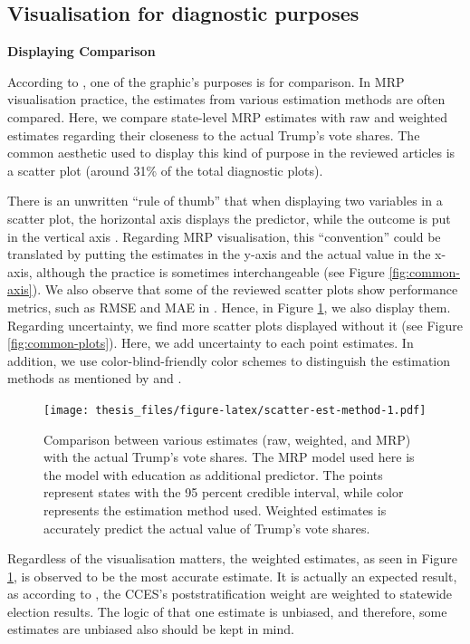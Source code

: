 \documentclass{monashthesis}
\begin{document}
\hypertarget{vis-purp}{%
\subsection{Visualisation for diagnostic purposes}\label{vis-purp}}

\textbf{Displaying Comparison}

According to \textcite{tukey}, one of the graphic's purposes is for comparison. In MRP visualisation practice, the estimates from various estimation methods are often compared. Here, we compare state-level MRP estimates with raw and weighted estimates regarding their closeness to the actual Trump's vote shares. The common aesthetic used to display this kind of purpose in the reviewed articles is a scatter plot (around 31\% of the total diagnostic plots).

There is an unwritten ``rule of thumb'' that when displaying two variables in a scatter plot, the horizontal axis displays the predictor, while the outcome is put in the vertical axis \autocite{gelmanunwin}. Regarding MRP visualisation, this ``convention'' could be translated by putting the estimates in the y-axis and the actual value in the x-axis, although the practice is sometimes interchangeable (see Figure \ref{fig:common-axis}). We also observe that some of the reviewed scatter plots show performance metrics, such as RMSE and MAE in \textcite{MengXiao-Li2018Spap}. Hence, in Figure \ref{fig:scatter-est-method}, we also display them. Regarding uncertainty, we find more scatter plots displayed without it (see Figure \ref{fig:common-plots}). Here, we add uncertainty to each point estimates. In addition, we use color-blind-friendly color schemes to distinguish the estimation methods as mentioned by \textcite{vanderplas} and \textcite{statgraph}.

\begin{figure}
\centering
\texttt{[image: thesis\_files/figure-latex/scatter-est-method-1.pdf]}
\caption{\label{fig:scatter-est-method}Comparison between various estimates (raw, weighted, and MRP) with the actual Trump's vote shares. The MRP model used here is the model with education as additional predictor. The points represent states with the 95 percent credible interval, while color represents the estimation method used. Weighted estimates is accurately predict the actual value of Trump's vote shares.}
\end{figure}

Regardless of the visualisation matters, the weighted estimates, as seen in Figure \ref{fig:scatter-est-method}, is observed to be the most accurate estimate. It is actually an expected result, as according to \textcite{cces_data}, the CCES's poststratification weight are weighted to statewide election results. The logic of that one estimate is unbiased, and therefore, some estimates are unbiased also should be kept in mind.
\end{document}
